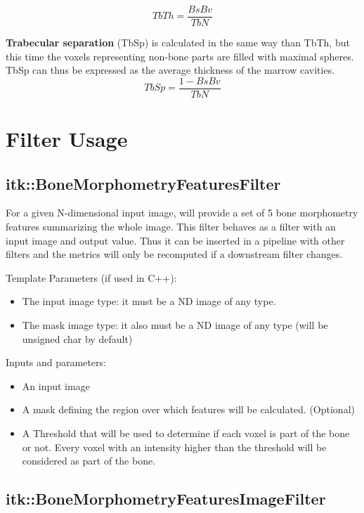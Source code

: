 \documentclass{InsightArticle}
\begin{document}
\begin{equation} \label{eqn:TbTh}
TbTh = \frac{BsBv}{TbN}
\end{equation}

\textbf{Trabecular separation} (TbSp) is calculated in the same way than TbTh, but this time the voxels representing non-bone parts are filled with maximal spheres. TbSp can thus be expressed as the average thickness of the marrow cavities.
\begin{equation} \label{eqn:TbSp}
TbSp = \frac{1 - BsBv}{TbN}
\end{equation}

\newpage
\section{Filter Usage}
\label{sec:filterUsage}

\subsection{itk::BoneMorphometryFeaturesFilter}
\label{sec:BMFilter}

For a given N-dimensional input image,  will provide a set of 5 bone morphometry features summarizing the whole image. This filter behaves as a filter with an input image and output value. Thus it can be inserted in a pipeline with other filters and the metrics will only be recomputed if a downstream filter changes.

Template Parameters (if used in C++):
\begin{itemize}
 \item The input image type: it must be a ND image of any type.
 \item The mask image type: it also must be a ND image of any type (will be unsigned char by default)
\end{itemize}

Inputs and parameters:
\begin{itemize}
 \item An input image
 \item A mask defining the region over which features will be calculated. (Optional)
 \item A Threshold that will be used to determine if each voxel is part of the bone or not. Every voxel with an intensity higher than the threshold will be considered as part of the bone.
\end{itemize}

\subsection{itk::BoneMorphometryFeaturesImageFilter}
\label{sec:BMImageFilter}
\end{document}
